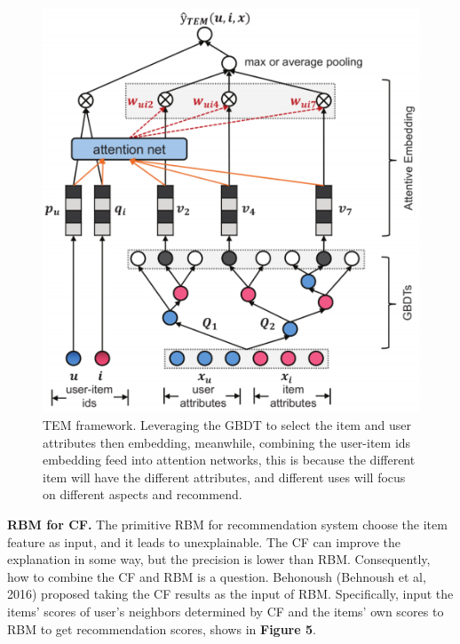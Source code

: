 \documentclass[10pt,twocolumn,letterpaper]{article}
\begin{document}
\begin{figure}
	\begin{center}
		\includegraphics[width=0.8\linewidth]{TEM_2.png}
	\end{center}
	\caption{TEM framework. Leveraging the GBDT to select the item and user attributes then embedding, meanwhile, combining the user-item ids embedding feed into attention networks, this is because the different item will have the different attributes, and different uses will focus on different aspects and recommend.}
	\label{fig:long}
	\label{fig:onecol}
\end{figure}

{\bf RBM for CF.} The primitive RBM for recommendation system choose the item feature as input, and it leads to unexplainable. The CF can improve the explanation in some way, but the precision is lower than RBM. Consequently, how to combine the CF and RBM is a question. Behonoush (Behnoush et al, 2016) proposed taking the CF results as the input of RBM. Specifically, input the items' scores of user's neighbors determined by CF and the items' own scores to RBM to get recommendation scores, shows in {\bf Figure 5}.
\end{document}
